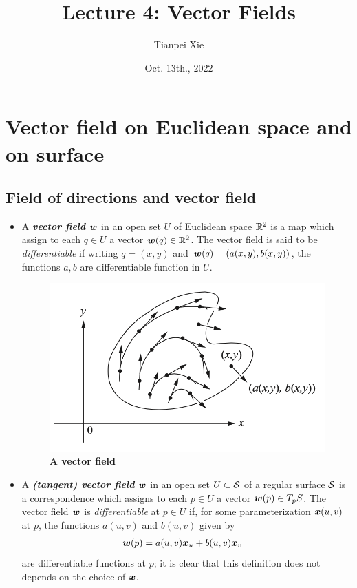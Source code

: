 \documentclass[11pt]{article}
\begin{document}
\title{Lecture 4: Vector Fields}
\author{ Tianpei Xie}
\date{Oct. 13th., 2022}
\maketitle
\tableofcontents
\newpage
\section{Vector field on Euclidean space and on surface}
\subsection{Field of directions and vector field}
\begin{itemize}
\item \begin{definition}
A \underline{\emph{\textbf{vector field}}} $\boldsymbol{w}$ in an open set $U$ of Euclidean space ${\mathbb R}^{2}$ is a map which assign to each $q\in U$ a vector $\boldsymbol{w}(q)\in {\mathbb R}^{2}$. The vector field is said to be \emph{differentiable} if writing $q=(x,y)$ and $\boldsymbol{w}(q)= (a(x,y), b(x,y))$, the functions $a,b$ are differentiable function in $U$.
\end{definition}

\begin{figure}[htb]
\centering
\begin{minipage}{0.5\linewidth}
 \centerline{\includegraphics[scale = 0.5]{vector_fields.png}}
\end{minipage}
\caption{\scriptsize
\textbf{A vector field}}
\label{fig: vector_fields}
\end{figure}

\item \begin{definition}
A \emph{\textbf{(tangent) vector field}} $\boldsymbol{w}$ in an open set $U \subset {\mathcal S}$ of a regular surface ${\mathcal S}$ is a correspondence which assigns to each $p\in U$ a vector $\boldsymbol{w}(p) \in T_{p}S$. The vector field $\boldsymbol{w}$ is \emph{differentiable} at $p\in U$ if, for some parameterization $\boldsymbol{x}(u,v)$ at $p$, the functions $a(u,v)$ and $b(u,v)$ given by 
\begin{align*}
\boldsymbol{w}(p) &= a(u,v)\boldsymbol{x}_{u} + b(u,v)\boldsymbol{x}_{v}
\end{align*}
are differentiable functions at $p$; it is clear that this definition does not depends on the choice of $\boldsymbol{x}$. 
\end{definition}


\end{itemize}
\end{document}
